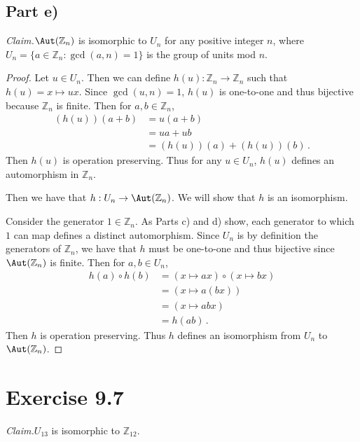 \documentclass{abrice}
\newcommand{\Z}{\mathbb{Z}}
\newcommand{\Claim}{\noindent\emph{Claim.}\xspace}%
\begin{document}
\subsection{Part e)}

\Claim $\Aut(\Z_n)$ is isomorphic to $U_n$ for any positive integer $n$, where
$U_n = \{ a \in \Z_n : \gcd(a,n) = 1\}$ is the group of units mod $n$.

\begin{proof}
  Let $u \in U_n$. Then we can define $h(u) : \Z_n \to \Z_n$ such that $h(u) = x
  \mapsto ux$. Since $\gcd(u,n) = 1$, $h(u)$ is one-to-one and thus bijective
  because $\Z_n$ is finite. Then for $a,b \in \Z_n$,
  \begin{align*}
    (h(u))(a + b)
    &= u(a + b) \\
    &= ua + ub \\
    &= (h(u))(a) + (h(u))(b)\, .
  \end{align*}
  Then $h(u)$ is operation preserving. Thus for any $u \in U_n$, $h(u)$ defines
  an automorphism in $\Z_n$.

  Then we have that $h : U_n \to \Aut(\Z_n)$. We will show that $h$ is an
  isomorphism.

  Consider the generator $1 \in \Z_n$. As Parts c) and d) show, each generator
  to which $1$ can map defines a distinct automorphism. Since $U_n$ is by
  definition the generators of $\Z_n$, we have that $h$ must be one-to-one and
  thus bijective since $\Aut(\Z_n)$ is finite. Then for $a,b \in U_n$,
  \begin{align*}
    h(a) \circ h(b)
    &= (x \mapsto ax) \circ (x \mapsto bx) \\
    &= (x \mapsto a(bx)) \\
    &= (x \mapsto abx) \\
    &= h(ab)\, .
  \end{align*}
  Then $h$ is operation preserving. Thus $h$ defines an isomorphism from $U_n$ to
  $\Aut(\Z_n)$.
\end{proof}

\section{Exercise 9.7}

\Claim $U_{13}$ is isomorphic to $\Z_{12}$.
\end{document}
